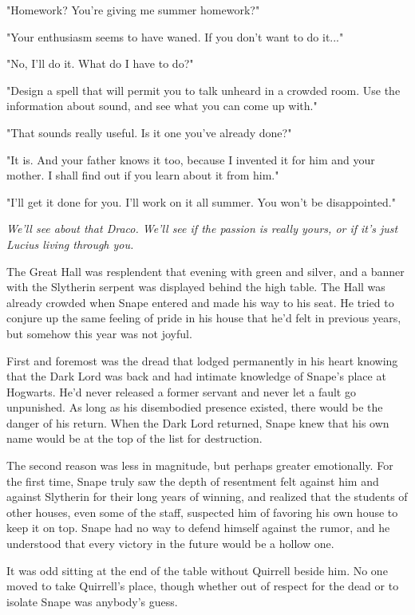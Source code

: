 "Homework? You're giving me summer homework?"

"Your enthusiasm seems to have waned. If you don't want to do it..."

"No, I'll do it. What do I have to do?"

"Design a spell that will permit you to talk unheard in a crowded room. Use the information about sound, and see what you can come up with."

"That sounds really useful. Is it one you've already done?"

"It is. And your father knows it too, because I invented it for him and your mother. I shall find out if you learn about it from him."

"I'll get it done for you. I'll work on it all summer. You won't be disappointed."

\emph{We'll see about that Draco. We'll see if the passion is really yours, or if it's just Lucius living through you.}

The Great Hall was resplendent that evening with green and silver, and a banner with the Slytherin serpent was displayed behind the high table. The Hall was already crowded when Snape entered and made his way to his seat. He tried to conjure up the same feeling of pride in his house that he'd felt in previous years, but somehow this year was not joyful.

First and foremost was the dread that lodged permanently in his heart knowing that the Dark Lord was back and had intimate knowledge of Snape's place at Hogwarts. He'd never released a former servant and never let a fault go unpunished. As long as his disembodied presence existed, there would be the danger of his return. When the Dark Lord returned, Snape knew that his own name would be at the top of the list for destruction.

The second reason was less in magnitude, but perhaps greater emotionally. For the first time, Snape truly saw the depth of resentment felt against him and against Slytherin for their long years of winning, and realized that the students of other houses, even some of the staff, suspected him of favoring his own house to keep it on top. Snape had no way to defend himself against the rumor, and he understood that every victory in the future would be a hollow one.

It was odd sitting at the end of the table without Quirrell beside him. No one moved to take Quirrell's place, though whether out of respect for the dead or to isolate Snape was anybody's guess.

